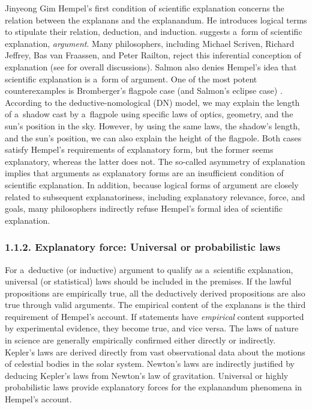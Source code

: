 \begin{artengenv}{Jinyeong Gim}
Hempel's first condition of scientific explanation concerns the relation between the explanans and the explanandum. He introduces logical terms to stipulate their relation, deduction, and induction.  
\parencite[][pp.335–393]{hempel_aspects_1965} %
 suggests a~form of scientific explanation, \textit{argument}. Many philosophers, including Michael Scriven, Richard Jeffrey, Bas van Fraassen, and Peter Railton, reject this inferential conception of explanation
 (see \cite{salmon_four_1989} for overall discussions).
 Salmon also denies Hempel's idea that scientific explanation is a~form of argument. One of the most potent counterexamples is Bromberger's flagpole case (and Salmon's eclipse case)
\parencite[][pp.46–47]{salmon_four_1989}. %
According to the deductive-nomological (DN) model, we may explain the length of a~shadow cast by a~flagpole using specific laws of optics, geometry, and the sun's position in the sky. However, by using the same laws, the shadow's length, and the sun's position, we can also explain the height of the flagpole. Both cases satisfy Hempel's requirements of explanatory form, but the former seems explanatory, whereas the latter does not. The so-called asymmetry of explanation implies that arguments as explanatory forms are an insufficient condition of scientific explanation. In addition, because logical forms of argument are closely related to subsequent explanatoriness, including explanatory relevance, force, and goals, many philosophers indirectly refuse Hempel's formal idea of scientific explanation.

\subsubsection{1.1.2. Explanatory force: Universal or probabilistic laws}

For a~deductive (or inductive) argument to qualify as a~scientific explanation, universal (or statistical) laws should be included in the premises. If the lawful propositions are empirically true, all the deductively derived propositions are also true through valid arguments. The empirical content of the explanans is the third requirement of Hempel's account. If statements have \textit{empirical} content supported by experimental evidence, they become true, and vice versa. The laws of nature in science are generally empirically confirmed either directly or indirectly. Kepler's laws are derived directly from vast observational data about the motions of celestial bodies in the solar system. Newton's laws are indirectly justified by deducing Kepler's laws from Newton's law of gravitation. Universal or highly probabilistic laws provide explanatory forces for the explanandum phenomena in Hempel's account.


\end{artengenv}
